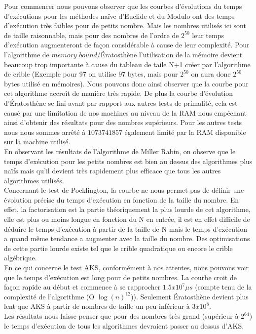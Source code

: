 	Pour commencer nous pouvons observer que les courbes d'évolutions du temps d'exécutions pour les méthodes naïve d'Euclide et du Modulo ont des temps d'exécution très faibles pour de petits nombre. Mais les nombres utilisés ici sont de taille raisonnable, mais pour des nombres de l'ordre de $2^{50}$ leur temps d'exécution augmenteront de façon considérable à cause de leur complexité. Pour l'algorithme de $memory\_bound$/Ératosthène l'utilisation de la mémoire devient beaucoup trop importante à cause du tableau de taile N+1 créer par l'algorithme de crible (Exemple pour 97 on utilise 97 bytes, mais pour $2^{50}$ on aura donc $2^{50}$ bytes utilisé en mémoires). Nous pouvons donc ainsi observer que la courbe pour cet algorithme accroît de manière très rapide. De plus la courbe d'évolution d’Ératosthène se fini avant par rapport aux autres tests de primalité, cela est causé par une limitation de nos machines au niveau de la RAM nous empêchant ainsi d'obtenir des résultats pour des nombres supérieurs. Pour les autres tests nous nous sommes arrêté à $1073741857$ également limité par la RAM disponible sur la machine utilisé.\\	
	
	En observant les résultats de l’algorithme de Miller Rabin, on observe que le temps d’exécution pour les petits nombres est bien au dessus des algorithmes plus naïfs mais qu’il devient très rapidement plus efficace que tous les autres algorithmes utilisés. \\		
		
		Concernant le test de Pocklington, la courbe ne nous permet pas de définir une évolution précise du temps d'exécution en fonction de la taille du nombre. En effet, la factorisation est la partie théoriquement la plus lourde de cet algorithme, elle est plus ou moins longue en fonction du N en entrée, il est en effet difficile de déduire le temps d’exécution à partir de la taille de N mais le temps d'exécution a quand même tendance a augmenter avec la taille du nombre. Des optimisations de cette partie lourde existe tel que le crible quadratique ou encore le crible algébrique.\\		
		En ce qui concerne le test AKS, conformément à nos attentes, nous pouvons voir que le temps d’exécution est long pour de petits nombres. La courbe croit de façon rapide au début et commence à se rapprocher $1.5x10^7 \mu s$ (compte tenu de la complexité de l’algorithme (O $\log(n)^{12}$)). Seulement Ératosthène devient plus lent que AKS à partir de nombres de taille un peu inférieur à $3x10^8$. \\
Les résultats nous laisse penser que pour des nombres très grand (supérieur à $2^{64}$) le temps d'exécution de tous les algorithmes devraient passer au dessus d’AKS.\\

